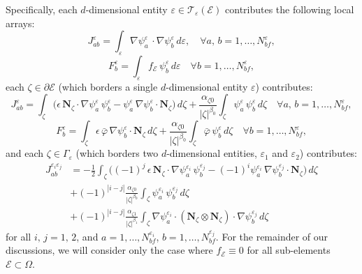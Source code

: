 	Specifically, each $d$-dimensional entity $\varepsilon \in \mathcal{T}_\varepsilon (\mathcal{E})$ contributes the following local arrays:
	\begin{equation}
			J^{\varepsilon}_{ab} = \int_{\varepsilon} \nabla \psi^{\varepsilon}_{a} \, \cdot \nabla \psi^{\varepsilon}_{b} \, d \varepsilon, \quad \forall a, \, b = 1, \ldots, N^{\varepsilon}_{bf},
	\end{equation}
	\begin{equation}
			F^{\varepsilon}_b = \int_{\varepsilon} f_{\mathcal{E}} \, \psi_b^{\varepsilon} \, d \varepsilon \quad \forall b = 1, \ldots, N^{\varepsilon}_{bf},
	\end{equation}
	each $\zeta \in \partial \mathcal{E}$ (which borders a single $d$-dimensional entity $\varepsilon$) contributes:
	\begin{equation}
			J^{\varepsilon}_{ab} = \int_{\zeta} \bigg( \epsilon \,  \mathbf{N}_{\zeta} \cdot \nabla \psi^{\varepsilon}_a \, \psi^{\varepsilon}_b - \psi^{\varepsilon}_a \, \nabla \psi^{\varepsilon}_b \cdot \mathbf{N}_{\zeta} \bigg) \, d \zeta + \frac{\alpha_{\zeta0}}{|\zeta|^{\beta_0}} \int_{\zeta} \psi_a^{\varepsilon} \, \psi_b^{\varepsilon} \, d \zeta \quad \forall a, \, b = 1, \ldots, N^{\varepsilon}_{bf},
	\end{equation}
	\begin{equation}
		F^{\varepsilon}_b = \int_{\zeta} \epsilon \, \bar{\varphi} \, \nabla \psi_b^{\varepsilon} \cdot \mathbf{N}_{\zeta} \, d \zeta + \frac{\alpha_{\zeta0}}{|\zeta|^{\beta_0}} \int_{\zeta} \bar{\varphi} \, \psi_b^{\varepsilon} \, d \zeta \quad \forall b = 1, \ldots, N^{\varepsilon}_{bf},
		\label{eq:boundary_term}
	\end{equation}
	and each $\zeta \in \Gamma_\varepsilon$ (which borders two $d$-dimensional entities, $\varepsilon_1$ and $\varepsilon_2$) contributes:
	\begin{align}
			J^{\varepsilon_i \varepsilon_j}_{ab} & = - \frac{1}{2} \int_{\zeta} \bigg( (-1)^{j} \, \epsilon \, \mathbf{N}_{\zeta} \cdot \nabla \psi_a^{\varepsilon_i} \, \psi_b^{\varepsilon_j} - (-1)^{i} \psi_a^{\varepsilon_i} \, \nabla \psi_b^{\varepsilon_j} \cdot \mathbf{N}_{\zeta} \bigg) \, d \zeta \\
			& + (-1)^{|i-j|} \frac{\alpha_{\zeta0}}{|\zeta|^{\beta_0}} \int_{\zeta} \psi_a^{\varepsilon_i} \, \psi_b^{\varepsilon_j} \, d \zeta \\
			& + (-1)^{|i-j|} \frac{\alpha_{\zeta1}}{|\zeta|^{\beta_1}} \int_{\zeta} \nabla \psi_a^{\varepsilon_i} \cdot (\mathbf{N}_\zeta \otimes \mathbf{N}_\zeta) \cdot \nabla \psi_b^{\varepsilon_j} \, d \zeta
	\end{align}
	for all $i, \, j = 1, \, 2$, and $a = 1, \ldots, N^{\varepsilon_i}_{bf}$, $b = 1, \ldots, N^{\varepsilon_j}_{bf}$. For the remainder of our discussions, we will consider only the case where $f_\mathcal{E} \equiv 0$ for all sub-elements $\mathcal{E} \subset \Omega$.
	
